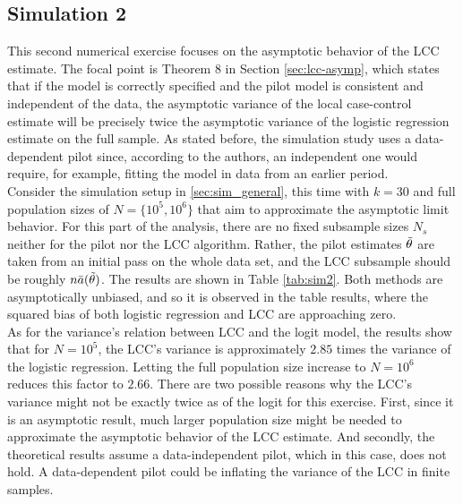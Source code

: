 \subsection{Simulation 2}
\label{sec:sim2}

This second numerical exercise focuses on the asymptotic behavior of the LCC estimate. The focal point is Theorem 8 in Section \ref{sec:lcc-asymp}, which states that if the model is correctly specified and the pilot model is consistent and independent of the data, the asymptotic variance of the local case-control estimate will be precisely twice the asymptotic variance of the logistic regression estimate on the full sample. As stated before, the simulation study uses a data-dependent pilot since, according to the authors, an independent one would require, for example, fitting the model in data from an earlier period.\\

Consider the simulation setup in \ref{sec:sim_general}, this time with $k=30$ and full population sizes of $N=\{10^5, 10^6\}$ that aim to approximate the asymptotic limit behavior. For this part of the analysis, there are no fixed subsample sizes $N_s$ neither for the pilot nor the LCC algorithm. Rather, the pilot estimates $\Tilde{\theta}$ are taken from an initial pass on the whole data set, and the LCC subsample should be roughly $n\Bar{a}(\Tilde{\theta})$. The results are shown in Table \ref{tab:sim2}. Both methods are asymptotically unbiased, and so it is observed in the table results, where the squared bias of both logistic regression and LCC are approaching zero.\\

As for the variance's relation between LCC and the logit model, the results show that for $N=10^5$, the LCC's variance is approximately $2.85$ times the variance of the logistic regression. Letting the full population size increase to $N=10^6$ reduces this factor to  $2.66$. There are two possible reasons why the LCC's variance might not be exactly twice as of the logit for this exercise. First, since it is an asymptotic result, much larger population size might be needed to approximate the asymptotic behavior of the LCC estimate. And secondly, the theoretical results assume a data-independent pilot, which in this case, does not hold. A data-dependent pilot could be inflating the variance of the LCC in finite samples.

